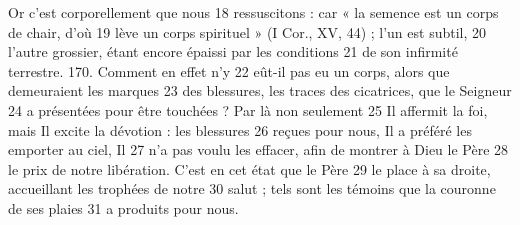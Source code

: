 Or c'est corporellement que nous	 
18	 	ressuscitons : car « la semence est un corps de chair, d'où	 
19	 	lève un corps spirituel » (I Cor., XV, 44) ; l'un est subtil,	 
20	 	l'autre grossier, étant encore épaissi par les conditions	 
21	 	de son infirmité terrestre. 170. Comment en effet n'y	 
22	 	eût-il pas eu un corps, alors que demeuraient les marques	 
23	 	des blessures, les traces des cicatrices, que le Seigneur	 
24	 	a présentées pour être touchées ? Par là non seulement	 
25	 	Il affermit la foi, mais Il excite la dévotion : les blessures	 
26	 	reçues pour nous, Il a préféré les emporter au ciel, Il	 
27	 	n'a pas voulu les effacer, afin de montrer à Dieu le Père	 
28	 	le prix de notre libération. C'est en cet état que le Père	 
29	 	le place à sa droite, accueillant les trophées de notre	 
30	 	salut ; tels sont les témoins que la couronne de ses plaies	 
31	 	a produits pour nous.